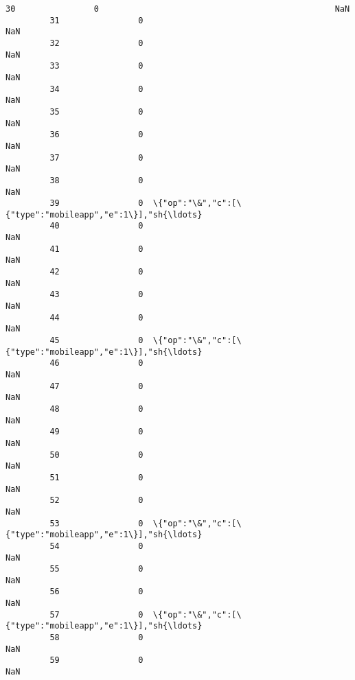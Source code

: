 \documentclass[11pt]{article}
\begin{document}
\begin{Verbatim}[commandchars=\\\{\}]
         30                0                                                NaN   
         31                0                                                NaN   
         32                0                                                NaN   
         33                0                                                NaN   
         34                0                                                NaN   
         35                0                                                NaN   
         36                0                                                NaN   
         37                0                                                NaN   
         38                0                                                NaN   
         39                0  \{"op":"\&","c":[\{"type":"mobileapp","e":1\}],"sh{\ldots}   
         40                0                                                NaN   
         41                0                                                NaN   
         42                0                                                NaN   
         43                0                                                NaN   
         44                0                                                NaN   
         45                0  \{"op":"\&","c":[\{"type":"mobileapp","e":1\}],"sh{\ldots}   
         46                0                                                NaN   
         47                0                                                NaN   
         48                0                                                NaN   
         49                0                                                NaN   
         50                0                                                NaN   
         51                0                                                NaN   
         52                0                                                NaN   
         53                0  \{"op":"\&","c":[\{"type":"mobileapp","e":1\}],"sh{\ldots}   
         54                0                                                NaN   
         55                0                                                NaN   
         56                0                                                NaN   
         57                0  \{"op":"\&","c":[\{"type":"mobileapp","e":1\}],"sh{\ldots}   
         58                0                                                NaN   
         59                0                                                NaN   
         

\end{Verbatim}
\end{document}
